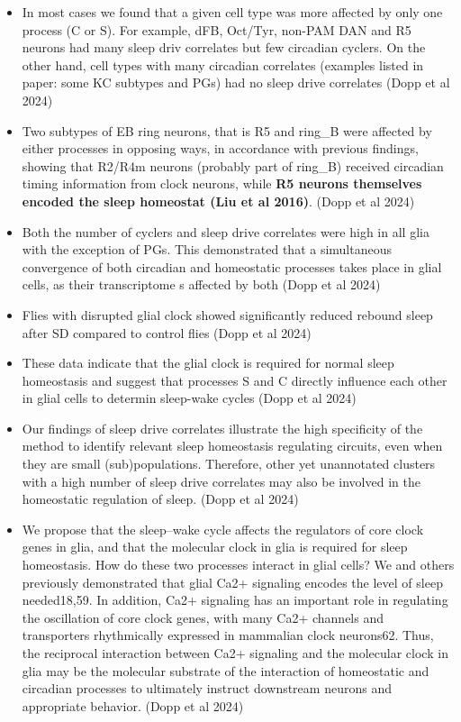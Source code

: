 \documentclass[11pt]{article}
\begin{document}
\begin{itemize}
    \item In most cases we found that a given cell type was more affected by only one process (C or S). For example,
    dFB, Oct/Tyr, non-PAM DAN and R5 neurons had many sleep driv correlates but few circadian cyclers. On the
    other hand, cell types with many circadian correlates (examples listed in paper: some KC subtypes and PGs) had
    no sleep drive correlates
    (Dopp et al 2024)

    \item Two subtypes of EB ring neurons, that is R5 and ring\_B were affected by either processes in opposing ways, in
    accordance with previous findings, showing that R2/R4m neurons (probably part of ring\_B) received circadian timing
    information from clock neurons, while \textbf{R5 neurons themselves encoded the sleep homeostat (Liu et al 2016)}.
    (Dopp et al 2024)

    \item Both the number of cyclers and sleep drive correlates were high in all glia with the exception of PGs. This
    demonstrated that a simultaneous convergence of both circadian and homeostatic processes takes place in glial cells,
    as their transcriptome s affected by both
    (Dopp et al 2024)

    \item Flies with disrupted glial clock showed significantly reduced rebound sleep after SD compared to control flies
    (Dopp et al 2024)

    \item These data indicate that the glial clock is required for normal sleep homeostasis and suggest that processes S and C
    directly influence each other in glial cells to determin sleep-wake cycles
    (Dopp et al 2024)

    \item Our findings of sleep drive correlates illustrate the high specificity of the method to identify relevant sleep
    homeostasis regulating circuits, even when they are small (sub)populations. Therefore, other yet unannotated clusters
    with a high number of sleep drive correlates may also be involved in the homeostatic regulation of sleep.
    (Dopp et al 2024)

    \item We propose that the sleep–wake cycle affects the regulators of core clock genes in glia, and that the
    molecular clock in glia is required for sleep homeostasis. How do these two processes interact in glial cells?
    We and others previously demonstrated that glial Ca2+ signaling encodes the level of sleep needed18,59.
    In addition, Ca2+ signaling has an important role in regulating the oscillation of core clock genes, with
    many Ca2+ channels and transporters rhythmically expressed in mammalian clock neurons62. Thus, the reciprocal
    interaction between Ca2+ signaling and the molecular clock in glia may be the molecular substrate of the
    interaction of homeostatic and circadian processes to ultimately instruct downstream neurons and appropriate
    behavior.
    (Dopp et al 2024)


\end{itemize}
\end{document}
